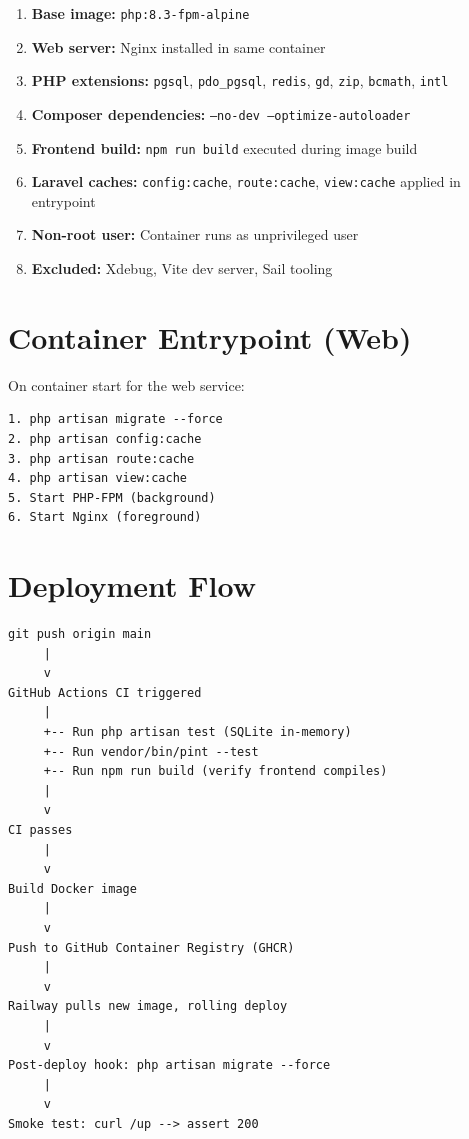 \documentclass[12pt,a4paper]{report}
\begin{document}
\begin{enumerate}[leftmargin=1.5em]
    \item \textbf{Base image:} \texttt{php:8.3-fpm-alpine}
    \item \textbf{Web server:} Nginx installed in same container
    \item \textbf{PHP extensions:} \texttt{pgsql}, \texttt{pdo\_pgsql},
          \texttt{redis}, \texttt{gd}, \texttt{zip}, \texttt{bcmath},
          \texttt{intl}
    \item \textbf{Composer dependencies:} \texttt{--no-dev --optimize-autoloader}
    \item \textbf{Frontend build:} \texttt{npm run build} executed during image build
    \item \textbf{Laravel caches:} \texttt{config:cache}, \texttt{route:cache},
          \texttt{view:cache} applied in entrypoint
    \item \textbf{Non-root user:} Container runs as unprivileged user
    \item \textbf{Excluded:} Xdebug, Vite dev server, Sail tooling
\end{enumerate}

\section{Container Entrypoint (Web)}

On container start for the web service:

\begin{lstlisting}[caption={Production entrypoint sequence}]
1. php artisan migrate --force
2. php artisan config:cache
3. php artisan route:cache
4. php artisan view:cache
5. Start PHP-FPM (background)
6. Start Nginx (foreground)
\end{lstlisting}

\section{Deployment Flow}

\begin{lstlisting}[caption={End-to-end deployment flow}]
git push origin main
     |
     v
GitHub Actions CI triggered
     |
     +-- Run php artisan test (SQLite in-memory)
     +-- Run vendor/bin/pint --test
     +-- Run npm run build (verify frontend compiles)
     |
     v
CI passes
     |
     v
Build Docker image
     |
     v
Push to GitHub Container Registry (GHCR)
     |
     v
Railway pulls new image, rolling deploy
     |
     v
Post-deploy hook: php artisan migrate --force
     |
     v
Smoke test: curl /up --> assert 200
\end{lstlisting}
\end{document}
